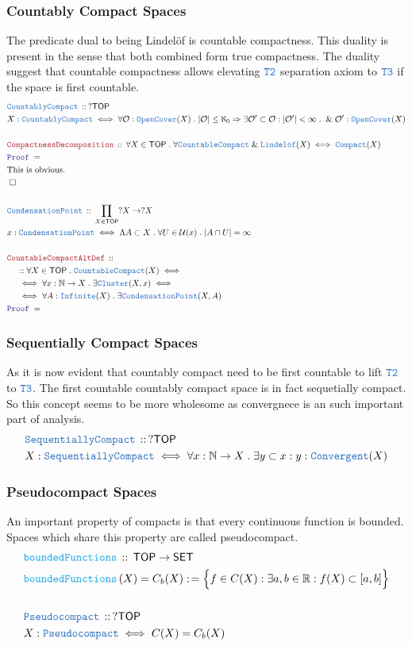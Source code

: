 \documentclass[12pt]{scrartcl}
\newcommand{\TYPE}[1]{\textcolor{NavyBlue}{\mathtt{#1}}}
\newcommand{\FUNC}[1]{\textcolor{Cerulean}{\mathtt{#1}}}
\newcommand{\LOGIC}[1]{\textcolor{Blue}{\mathtt{#1}}}
\newcommand{\THM}[1]{\textcolor{Maroon}{\mathtt{#1}}}
\renewcommand{\.}{\; . \;}
\newcommand{\de}{: \kern 0.1pc =}
\newcommand{\Act}[1]{\left( #1 \right)}
\newcommand{\Theorem}[2]{& \THM{#1} \, :: \, #2 \\ & \Proof = \\ }
\newcommand{\DeclareType}[2]{& \TYPE{#1} \, :: \, #2 \\}
\newcommand{\DefineType}[3]{& #1 : \TYPE{#2} \iff #3 \\}
\newcommand{\DeclareFunc}[2]{& \FUNC{#1} \, :: \, #2 \\}
\newcommand{\DefineNamedFunc}[4]{&  \FUNC{#1}\Act{#2} = #3 \de #4 \\}
\newcommand{\NewLine}{\\ & \kern 1pc}
\newcommand{\Page}[1]{ \begin{align*} #1 \end{align*}   }
\newcommand{\Explain}[1]{& \text{#1.} \\}
\renewcommand{\And}{\; \& \;}
\newcommand{\Imply}{\Rightarrow}
\newcommand{\Reals}{\mathbb{R} }
\newcommand{\Nat}{\mathbb{N} }
\newcommand{\QED}{\; \square}
\newcommand{\EndProof}{& \QED \\}
\newcommand{\Proof}{\LOGIC{Proof} \; }
\newcommand{\SET}{\mathsf{SET}}
\newcommand{\Cluster}{\TYPE{Cluster}}
\newcommand{\Compact}{\TYPE{Compact}}
\newcommand{\Lindelof}{\TYPE{Lindel\ddot{o}f}}
\newcommand{\CCompact}{\TYPE{CountableCompact}}
\newcommand{\TOP}{\mathsf{TOP}}
\newcommand{\U}{\mathcal{U}}
\renewcommand{\O}{\mathcal{O}}
\begin{document}
\subsubsection{Countably Compact Spaces}
The predicate dual to being Lindel\"of is countable compactness. This duality is present in the sense that both combined form true compactness. The duality suggest that countable compactness allows elevating $\TYPE{T2}$ separation axiom to $\TYPE{T3}$ if the space is first countable.
\Page{
	\DeclareType{CountablyCompact}{?\TOP}
	\DefineType{X}{CountablyCompact}{
			\forall \O : \TYPE{OpenCover}(X) \. 
			|\O| \le \aleph_0 \Imply \exists \O' \subset \O : |\O'| < \infty \. 
			\And \O' : \TYPE{OpenCover}(X) 
		}
	\\
	\Theorem{CompactnessDecomposition}
	{
		\forall X \in \TOP \.
		\forall \CCompact \And \Lindelof(X) 
		\iff
		\Compact(X)
	}
	\Explain{This is obvious}
	\EndProof
	\\
	\DeclareType{CondensationPoint}
	{
		\prod_{ X \in \TOP }
		?X \to ?X
	}
	\DefineType{x}{CondensationPoint}
	{
		\Lambda A \subset X \. \forall U \in \U(x) \. |A \cap U| = \infty 
	}
	\\
	\Theorem{CountableCompactAltDef}
	{
		\NewLine ::		
		\forall X \in \TOP \.
		\CCompact(X)
		\iff  \NewLine \iff
	 	\forall x : \Nat \to X \. \exists \Cluster(X,x)
	 	\iff \NewLine \iff
	 	\forall  A : \TYPE{Infinite}(X) \. \exists \TYPE{CondensationPoint}(X,A)
	}
}
\newpage
\subsubsection{Sequentially Compact Spaces }
As it is now evident that countably compact need to be first countable to lift 
$\TYPE{T2}$ to $\TYPE{T3}$. 
The first countable countably compact space is in fact sequetially compact.
So this concept seems to be more wholesome as convergnece is an such 
important part of analysis. 
\Page{
	\DeclareType{SequentiallyCompact}{?\TOP}
	\DefineType{X}{SequentiallyCompact}{\forall x : \Nat \to X \. \exists y \subset x : y : \TYPE{Convergent}(X)}
}
\newpage
\subsubsection{Pseudocompact Spaces}
An important property of compacts is that every continuous function is bounded. 
Spaces which share this property are called pseudocompact.
\Page{
	\DeclareFunc{boundedFunctions}{\TOP \to \SET}
	\DefineNamedFunc{boundedFunctions}{X}{C_b(X)}{\Big\{ f \in C(X) : \exists a,b \in \Reals : f(X) \subset [a,b] \Big\}}
	\\
	\DeclareType{Pseudocompact}{?\TOP}
	\DefineType{X}{Pseudocompact}{ C(X)  = C_b(X)}
}
\newpage
\end{document}
